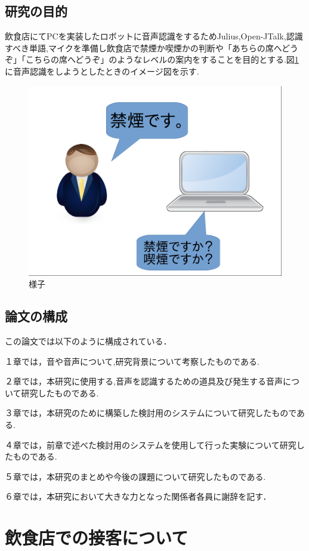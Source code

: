 \documentclass[12pt,oneside]{sotsuken_paper}
\begin{document}
\section{研究の目的}
飲食店にてPCを実装したロボットに音声認識をするためJulius,Open-JTalk,認識すべき単語,マイクを準備し飲食店で禁煙か喫煙かの判断や「あちらの席へどうぞ」「こちらの席へどうぞ」のようなレベルの案内をすることを目的とする.図\ref{fig:yousu}に音声認識をしようとしたときのイメージ図を示す.
\begin{figure}[htbp]
\begin{center}
\includegraphics[width=120mm]{img/Image.png}
\caption{様子}
\label{fig:yousu}
\end{center}
\end{figure}
\section{論文の構成}
この論文では以下のように構成されている．


１章では，音や音声について,研究背景について考察したものである.


２章では，本研究に使用する,音声を認識するための道具及び発生する音声について研究したものである.


３章では，本研究のために構築した検討用のシステムについて研究したものである.


４章では，前章で述べた検討用のシステムを使用して行った実験について研究したものである.


５章では，本研究のまとめや今後の課題について研究したものである.


６章では，本研究において大きな力となった関係者各員に謝辞を記す．
\chapter{飲食店での接客について}
\end{document}
